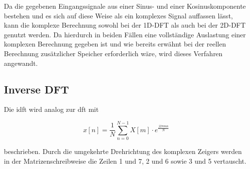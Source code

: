 %   




Da die gegebenen Eingangssignale aus einer Sinus- und einer Kosinuskomponente bestehen und es sich auf diese Weise als ein komplexes Signal auffassen lässt, kann die 
komplexe Berechnung sowohl bei der 1D-DFT als auch bei der 2D-DFT genutzt werden. 
Da hierdurch in beiden Fällen eine vollständige Auslastung einer komplexen Berechnung gegeben ist und wie bereits erwähnt bei der reellen Berechnung zusätzlicher Speicher 
erforderlich wäre, wird dieses Verfahren angewandt.


\subsection{Inverse DFT}

Die \gls{idft} wird analog zur \gls{dft} mit 

\begin{equation}\label{eq:idft}
 x \left[ n \right] = \frac{1}{N} \sum^{N-1}_{n=0} X[m] \cdot e^{\frac{j 2 \pi m n}{N}}
\end{equation}

beschrieben. Durch die umgekehrte Drehrichtung des komplexen Zeigers werden in der Matrizenschreibweise die Zeilen 1 und 7, 2 und 6 sowie 3 und 5 vertauscht.




